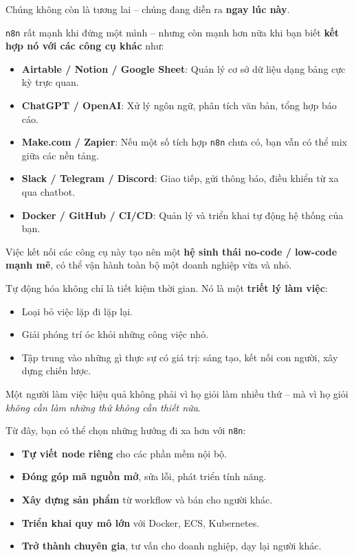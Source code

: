 Chúng không còn là tương lai – chúng đang diễn ra \textbf{ngay lúc này}.

\vspace{1em}

\texttt{n8n} rất mạnh khi đứng một mình – nhưng còn mạnh hơn nữa khi bạn biết \textbf{kết hợp nó với các công cụ khác} như:

\begin{itemize}
    \item \textbf{Airtable / Notion / Google Sheet}: Quản lý cơ sở dữ liệu dạng bảng cực kỳ trực quan.
    \item \textbf{ChatGPT / OpenAI}: Xử lý ngôn ngữ, phân tích văn bản, tổng hợp báo cáo.
    \item \textbf{Make.com / Zapier}: Nếu một số tích hợp \texttt{n8n} chưa có, bạn vẫn có thể mix giữa các nền tảng.
    \item \textbf{Slack / Telegram / Discord}: Giao tiếp, gửi thông báo, điều khiển từ xa qua chatbot.
    \item \textbf{Docker / GitHub / CI/CD}: Quản lý và triển khai tự động hệ thống của bạn.
\end{itemize}

Việc kết nối các công cụ này tạo nên một \textbf{hệ sinh thái no-code / low-code mạnh mẽ}, có thể vận hành toàn bộ một doanh nghiệp vừa và nhỏ.

\vspace{1em}

Tự động hóa không chỉ là tiết kiệm thời gian. Nó là một \textbf{triết lý làm việc}:

\begin{itemize}
    \item Loại bỏ việc lặp đi lặp lại.
    \item Giải phóng trí óc khỏi những công việc nhỏ.
    \item Tập trung vào những gì thực sự có giá trị: sáng tạo, kết nối con người, xây dựng chiến lược.
\end{itemize}

Một người làm việc hiệu quả không phải vì họ giỏi làm nhiều thứ – mà vì họ giỏi \textit{không cần làm những thứ không cần thiết nữa}.

\vspace{1em}

Từ đây, bạn có thể chọn những hướng đi xa hơn với \texttt{n8n}:

\begin{itemize}
    \item \textbf{Tự viết node riêng} cho các phần mềm nội bộ.
    \item \textbf{Đóng góp mã nguồn mở}, sửa lỗi, phát triển tính năng.
    \item \textbf{Xây dựng sản phẩm} từ workflow và bán cho người khác.
    \item \textbf{Triển khai quy mô lớn} với Docker, ECS, Kubernetes.
    \item \textbf{Trở thành chuyên gia}, tư vấn cho doanh nghiệp, dạy lại người khác.
\end{itemize}


